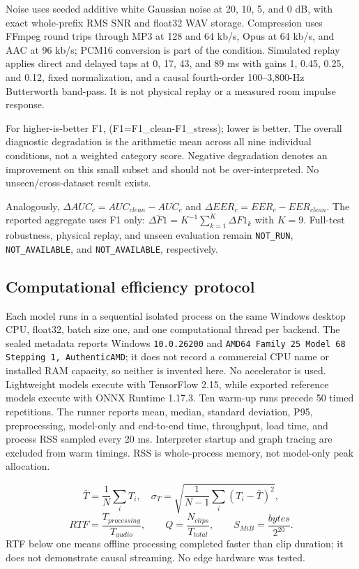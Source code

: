 \documentclass[10pt,journal]{IEEEtran}
\begin{document}
Noise uses seeded additive white Gaussian noise at 20, 10, 5, and 0 dB, with exact whole-prefix RMS SNR and float32 WAV storage. Compression uses FFmpeg round trips through MP3 at 128 and 64 kb/s, Opus at 64 kb/s, and AAC at 96 kb/s; PCM16 conversion is part of the condition. Simulated replay applies direct and delayed taps at 0, 17, 43, and 89 ms with gains 1, 0.45, 0.25, and 0.12, fixed normalization, and a causal fourth-order 100–3,800-Hz Butterworth band-pass. It is not physical replay or a measured room impulse response.

For higher-is-better F1, (\Delta F1=F1\_{clean}-F1\_{stress}); lower is better. The overall diagnostic degradation is the arithmetic mean across all nine individual conditions, not a weighted category score. Negative degradation denotes an improvement on this small subset and should not be over-interpreted. No unseen/cross-dataset result exists.

Analogously, $\Delta AUC_c=AUC_{clean}-AUC_c$ and $\Delta EER_c=EER_c-EER_{clean}$. The reported aggregate uses F1 only: $\overline{\Delta F1}=K^{-1}\sum_{k=1}^{K}\Delta F1_k$ with $K=9$. Full-test robustness, physical replay, and unseen evaluation remain \texttt{NOT\_RUN}, \texttt{NOT\_AVAILABLE}, and \texttt{NOT\_AVAILABLE}, respectively.

\subsection{Computational efficiency protocol}
Each model runs in a sequential isolated process on the same Windows desktop CPU, float32, batch size one, and one computational thread per backend. The sealed metadata reports Windows \texttt{10.0.26200} and \texttt{AMD64 Family 25 Model 68 Stepping 1, AuthenticAMD}; it does not record a commercial CPU name or installed RAM capacity, so neither is invented here. No accelerator is used. Lightweight models execute with TensorFlow 2.15, while exported reference models execute with ONNX Runtime 1.17.3. Ten warm-up runs precede 50 timed repetitions. The runner reports mean, median, standard deviation, P95, preprocessing, model-only and end-to-end time, throughput, load time, and process RSS sampled every 20 ms. Interpreter startup and graph tracing are excluded from warm timings. RSS is whole-process memory, not model-only peak allocation.

\begin{equation}
\bar T=\frac{1}{N}\sum_iT_i,\quad \sigma_T=\sqrt{\frac{1}{N-1}\sum_i(T_i-\bar T)^2},
\end{equation}
\begin{equation}
RTF=\frac{T_{processing}}{T_{audio}},\qquad Q=\frac{N_{clips}}{T_{total}},\qquad S_{MiB}=\frac{bytes}{2^{20}}.
\end{equation}
RTF below one means offline processing completed faster than clip duration; it does not demonstrate causal streaming. No edge hardware was tested.
\end{document}
